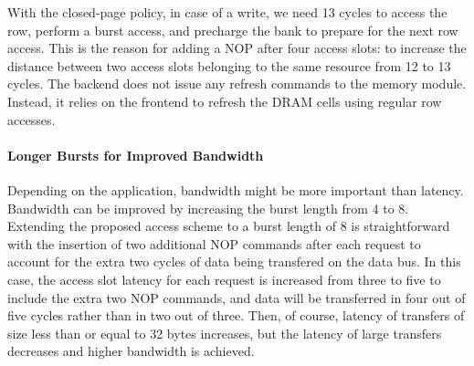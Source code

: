With the closed-page policy, in case of a write, we need 13 cycles to access the row, perform a burst access, and precharge the bank to prepare for the next row access.
This is the reason for adding a NOP after four access slots: to increase the distance between two access slots belonging to the same resource from 12 to 13 cycles.
The backend does not issue any refresh commands to the memory module.
Instead, it relies on the frontend to refresh the DRAM cells using regular row accesses.


\paragraph{Longer Bursts for Improved Bandwidth}
Depending on the application, bandwidth might be more important than latency.
Bandwidth can be improved by increasing the burst length from 4 to 8.
Extending the proposed access scheme to a burst length of 8 is straightforward with the insertion of two additional NOP commands after each request to account for the extra two cycles of data being transfered on the data bus.  
In this case, the access slot latency for each request is increased from three to five to include the extra two NOP commands, and data will be transferred in four out of five cycles rather than in two out of three.
Then, of course, latency of transfers of size less than or equal to 32 bytes increases, but the latency of large transfers decreases and higher bandwidth is achieved. 



